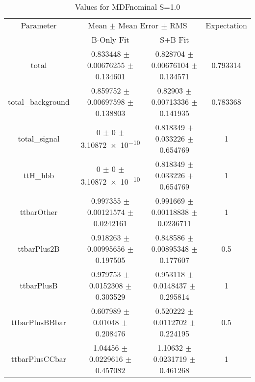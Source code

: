 \begin{table}
\centering
\caption{Values for MDFnominal S=1.0}
\begin{tabular}{cccc}
\toprule
Parameter & \multicolumn{2}{c}{Mean $\pm$ Mean Error $\pm$ RMS} & Expectation\\
 & B-Only Fit & S+B Fit & \\
\midrule
total & \num{0.833448} $\pm$ \num{0.00676255} $\pm$ \num{0.134601} & \num{0.828704} $\pm$ \num{0.00676104} $\pm$ \num{0.134571} & \num{0.793314}\\
total\_background & \num{0.859752} $\pm$ \num{0.00697598} $\pm$ \num{0.138803} & \num{0.82903} $\pm$ \num{0.00713336} $\pm$ \num{0.141935} & \num{0.783368}\\
total\_signal & \num{0} $\pm$ \num{0} $\pm$ \num{3.10872e-10} & \num{0.818349} $\pm$ \num{0.033226} $\pm$ \num{0.654769} & \num{1}\\
ttH\_hbb & \num{0} $\pm$ \num{0} $\pm$ \num{3.10872e-10} & \num{0.818349} $\pm$ \num{0.033226} $\pm$ \num{0.654769} & \num{1}\\
ttbarOther & \num{0.997355} $\pm$ \num{0.00121574} $\pm$ \num{0.0242161} & \num{0.991669} $\pm$ \num{0.00118838} $\pm$ \num{0.0236711} & \num{1}\\
ttbarPlus2B & \num{0.918263} $\pm$ \num{0.00995656} $\pm$ \num{0.197505} & \num{0.848586} $\pm$ \num{0.00895348} $\pm$ \num{0.177607} & \num{0.5}\\
ttbarPlusB & \num{0.979753} $\pm$ \num{0.0152308} $\pm$ \num{0.303529} & \num{0.953118} $\pm$ \num{0.0148437} $\pm$ \num{0.295814} & \num{1}\\
ttbarPlusBBbar & \num{0.607989} $\pm$ \num{0.01048} $\pm$ \num{0.208476} & \num{0.520222} $\pm$ \num{0.0112702} $\pm$ \num{0.224195} & \num{0.5}\\
ttbarPlusCCbar & \num{1.04456} $\pm$ \num{0.0229616} $\pm$ \num{0.457082} & \num{1.10632} $\pm$ \num{0.0231719} $\pm$ \num{0.461268} & \num{1}\\
\bottomrule
\end{tabular}
\end{table}